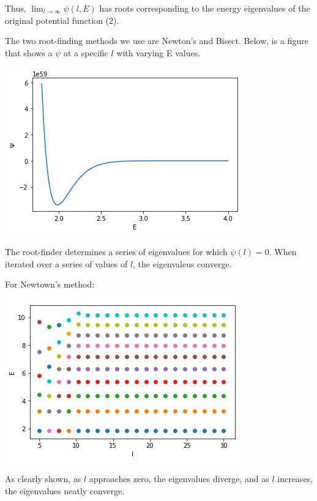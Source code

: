 \documentclass[12pt]{article}
\begin{document}
Thus, $\lim_{l \to \infty}\psi(l, E)$ has roots corresponding to the energy eigenvalues of the original potential function (2).

\bigbreak

The two root-finding methods we use are Newton's and Bisect. Below, is a figure that shows a $\psi$ at a specific $l$ with varying E values.

\begin{center}
\includegraphics{psilOverE.png}
\end{center}

The root-finder determines a series of eigenvalues for which $\psi(l) = 0$. When iterated over a series of values of $l$, the eigenvaleus converge.

\bigbreak
\bigbreak

For Newtown's method:
\begin{center}
\includegraphics{newtonEigen.png}
\end{center}

As clearly shown, as $l$ approaches zero, the eigenvalues diverge, and as $l$ increases, the eigenvalues neatly converge. 

\bigbreak
\bigbreak
\bigbreak
\bigbreak
\bigbreak
\bigbreak
\bigbreak
\bigbreak
\bigbreak
\bigbreak
\bigbreak
\bigbreak
\bigbreak
\bigbreak
\bigbreak
\bigbreak
\bigbreak
\bigbreak
\bigbreak
\bigbreak
\end{document}
